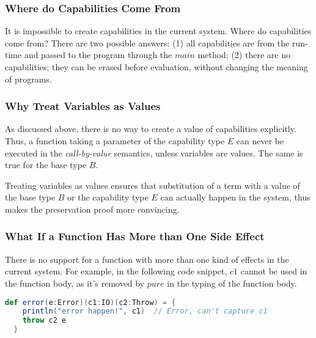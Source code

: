 \subsubsection{Where do Capabilities Come From}

It is impossible to create capabilities in the current system. Where
do capabilities come from?  There are two possible answers: (1) all
capabilities are from the run-time and passed to the program through
the $main$ method; (2) there are no capabilities; they can be erased
before evaluation, without changing the meaning of programs.


\subsubsection{Why Treat Variables as Values}

As discussed above, there is no way to create a value of capabilities
explicitly. Thus, a function taking a parameter of the capability type
$E$ can never be executed in the \emph{call-by-value} semantics,
unless variables are values. The same is true for the base type $B$.

Treating variables as values ensures that substitution of a term with
a value of the base type $B$ or the capability type $E$ can actually
happen in the system, thus makes the preservation proof more
convincing.


\subsubsection{What If a Function Has More than One Side Effect}

There is no support for a function with more than one kind of effects
in the current system. For example, in the following code snippet,
$c1$ cannot be used in the function body, as it's removed by $pure$ in
the typing of the function body.

\begin{lstlisting}[language=Scala]
  def error(e:Error)(c1:IO)(c2:Throw) = {
    println("error happen!", c1)  // Error, can't capture c1
    throw c2 e
  }
\end{lstlisting}

